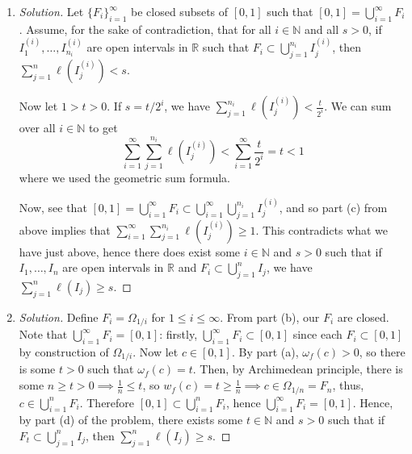 \documentclass{article}
\newcommand{\N}{{\mathbb N}}
\newcommand{\R}{{\mathbb R}}
\begin{document}
\begin{enumerate}
\begin{proof}[Solution]
		Note that if $J_1 = (a,b)$, $J_2 = (c,d)$ such that $J_1 \subset J_2$
		then we have $c \leq a$ and $d \geq b$, so $\ell(J_2) \geq \ell(J_1)$.
		So using this fact and $(0,1) \subset [0,1] \subset \bigcup_{i=1}^n I_i$,
		and what we showed before, we have
		\[
			\sum_{i=1}^n \ell(I_i) \geq \ell\left(\bigcup_{i=1}^n I_i\right)
			\geq \ell((0,1)) = 1
		\]

		Now, since $\ell(I_i) \geq 0$,
		adding more terms to our sum will only increase it,
		so $\sum_{i=1}^\infty \ell(I_i) \geq \sum_{i=1}^n \ell(I_i) \geq 1$.
	\end{proof}
	\item \begin{proof}[Solution]\let\qed\relax
		Let $\{F_i\}_{i=1}^\infty$ be closed subsets of $[0,1]$
		such that $[0,1] = \bigcup_{i=1}^\infty F_i$.
		Assume, for the sake of contradiction,
		that for all $i \in \N$ and all $s > 0$,
		if $I^{(i)}_1,\dots,I^{(i)}_{n_i}$ are open intervals in $\R$
		such that $F_i \subset \bigcup_{j=1}^{n_i}I_j^{(i)}$,
		then $\sum_{j=1}^n \ell(I^{(i)}_j) < s$.

		Now let $1 > t > 0$.
		If $s = t/2^i$, we have $\sum_{j=1}^{n_i} \ell(I^{(i)}_j) < \frac{t}{2^i}$.
		We can sum over all $i \in \N$ to get
		\[
			\sum_{i=1}^\infty \sum_{j=1}^{n_i} \ell(I_j^{(i)})
			< \sum_{i=1}^{\infty} \frac{t}{2^i}
			= t < 1
		\]
		where we used the geometric sum formula.

		Now, see that $[0,1] = \bigcup_{i=1}^\infty F_i
		\subset \bigcup_{i=1}^\infty \bigcup_{j=1}^{n_i} I_j^{(i)}$,
		and so part (c) from above implies that
		$\sum_{i=1}^\infty \sum_{j=1}^{n_i} \ell(I_j^{(i)}) \geq 1$.
		This contradicts what we have just above, hence
		there does exist some $i \in \N$ and $s > 0$
		such that if $I_1,\dots,I_n$ are open intervals in $\R$
		and $F_i \subset \bigcup_{j=1}^n I_j$,
		we have $\sum_{j=1}^n \ell(I_j) \geq s$.
	\end{proof}
	\item \begin{proof}[Solution]\let\qed\relax
		Define $F_i = \Omega_{1/i}$ for $1 \leq i \leq \infty$.
		From part (b), our $F_i$ are closed.
		Note that $\bigcup_{i=1}^\infty F_i = [0,1]$:
		firstly, $\bigcup_{i=1}^\infty F_i \subset [0,1]$
		since each $F_i \subset [0,1]$ by construction of $\Omega_{1/i}$.
		Now let $c \in [0,1]$.
		By part (a), $\omega_f(c) > 0$, so there is some $t > 0$
		such that $\omega_f(c) = t$.
		Then, by Archimedean principle, there is some $n \geq t > 0
		\implies \frac{1}{n} \leq t$, so
		$w_f(c) = t \geq \frac{1}{n} \implies c \in \Omega_{1/n} = F_n$,
		thus, $c \in \bigcup_{i=1}^n F_i$.
		Therefore $[0,1] \subset \bigcup_{i=1}^n F_i$,
		hence $\bigcup_{i=1}^\infty F_i = [0,1]$.
		Hence, by part (d) of the problem,
		there exists some $t \in \N$ and $s > 0$ such that if $F_t \subset \bigcup_{j=1}^n I_j$,
		then $\sum_{j=1}^n\ell(I_j) \geq s$.


\end{proof}
\end{enumerate}
\end{document}
